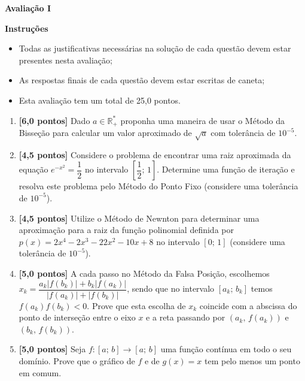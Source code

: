 \documentclass[12pt,a4paper]{article}
\begin{document}
\begin{center}
 \textbf{Avaliação I}
\end{center}

\textbf{Instruções}
\begin{itemize}
 \item Todas as justificativas necessárias na solução de cada questão devem estar presentes nesta avaliação;
 \item As respostas finais de cada questão devem estar escritas de caneta;
 \item Esta avaliação tem um total de 25,0 pontos.
\end{itemize}

\begin{enumerate}
 \item \textbf{[6,0 pontos]} Dado $a\in\mathbb{R}_+^*$ proponha uma maneira de usar o Método da Bisseção para calcular um valor aproximado de $\sqrt{a}$ com tolerância de $10^{-5}$.
 \item \textbf{[4,5 pontos]} Considere o problema de encontrar uma raiz aproximada da equação $e^{-x^2} = \dfrac{1}{2}$ no intervalo $\left[\dfrac{1}{2};\,1\right]$. Determine uma função de iteração e resolva este problema pelo Método do Ponto Fixo (considere uma tolerância 
 de $10^{-5}$).
 \item \textbf{[4,5 pontos]} Utilize o Método de Newnton para determinar uma aproximação para a raiz da função polinomial definida por $p(x) = 2x^4 -2x^3 -22x^2 - 10x + 8$ no intervalo $[0;\,1]$ (considere uma tolerância 
 de $10^{-5}$).
 \item \textbf{[5,0 pontos]} A cada passo no Método da Falsa Posição, escolhemos $x_k = \dfrac{a_k|f(b_k)| + b_k|f(a_k)|}{|f(a_k)|+|f(b_k)|}$, sendo que no intervalo $[a_k;\,b_k]$ temos $f(a_k)f(b_k)<0$. Prove que 
 esta escolha de $x_k$ coincide com a abscissa do ponto de interseção entre o eixo $x$ e a reta passando por $(a_k,\,f(a_k))$ e $(b_k,\,f(b_k))$.

 \item \textbf{[5,0 pontos]} Seja $f:[a;\, b]\to [a;\,b]$ uma função contínua em todo o seu domínio. Prove que o gráfico de $f$ e de $g(x) = x$ tem pelo 
menos um ponto em comum.

\end{enumerate}
\end{document}
